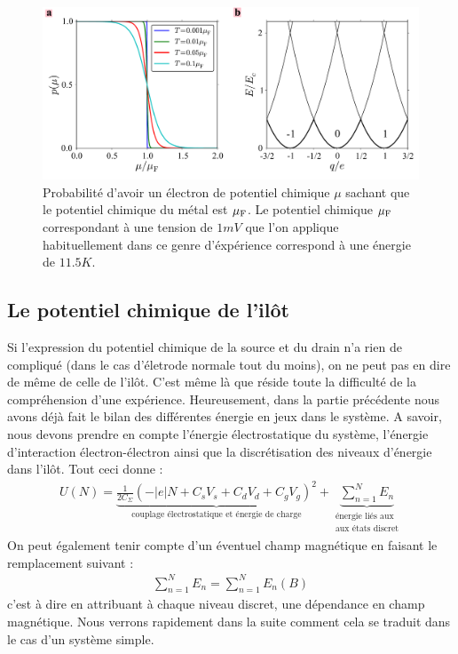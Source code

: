 \begin{figure}
\centering \includegraphics[scale=0.5]{Theorie/Transport/figure2/figure2.pdf} 
\caption{Probabilité d'avoir un électron de potentiel chimique $\mu$ sachant que le potentiel chimique du métal est $\mu_{\rm{F}}$. Le potentiel chimique $\mu_{\rm{F}}$ correspondant à une tension de $1mV$ que l'on applique habituellement dans ce genre d'éxpérience correspond à une énergie de $11.5K$.}
\label{distrib_fermi}
\end{figure}



\subsection{Le potentiel chimique de l'il\^ot}
Si l'expression du potentiel chimique de la source et du drain n'a rien de compliqué (dans le cas d'életrode normale tout du moins), on ne peut pas en dire de m\^eme de celle de l'il\^ot. C'est m\^eme là que réside toute la difficulté de la compréhension d'une expérience. Heureusement, dans la partie précédente nous avons déjà fait le bilan des différentes énergie en jeux dans le système. A savoir, nous devons prendre en compte l'énergie électrostatique du système, l'énergie d'interaction électron-électron ainsi que la discrétisation des niveaux d'énergie dans l'il\^ot. Tout ceci donne :
\begin{eqnarray}
U(N) = \underbrace{\frac{1}{2C_{\Sigma}} (-|e|N + C_sV_s + C_dV_d + C_gV_g)^2}_{\text{couplage électrostatique et énergie de charge}}
+ 
\underbrace{\sum_{n=1}^{N} E_n}_{\substack{\text{énergie liés aux} \\\text{aux états discret}}}
\end{eqnarray}
On peut également tenir compte d'un éventuel champ magnétique en faisant le remplacement suivant :
\begin{eqnarray}
\sum_{n=1}^N E_n = \sum_{n=1}^N E_n(B) \nonumber
\end{eqnarray}
c'est à dire en attribuant à chaque niveau discret, une dépendance en champ magnétique. Nous verrons rapidement dans la suite comment cela se traduit dans le cas d'un système simple. 

